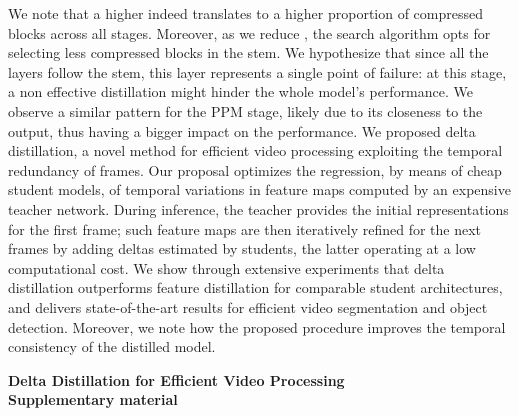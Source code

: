 \documentclass[runningheads]{llncs}
\newcommand{\opensupplement}{
    \setcounter{section}{0}
    \renewcommand\thesection{\Alph{section}}
}
\begin{document}
We note that a higher  indeed translates to a higher proportion of compressed blocks across all stages. Moreover, as we reduce , the search algorithm opts for selecting less compressed blocks in the stem. We hypothesize that since all the layers follow the stem, this layer represents a single point of failure: at this stage, a non effective distillation might hinder the whole model's performance. We observe a similar pattern for the PPM stage, likely due to its closeness to the output, thus having a bigger impact on the performance.
\label{sec:conclusion}
We proposed delta distillation, a novel method for efficient video processing exploiting the temporal redundancy of frames.
Our proposal optimizes the regression, by means of cheap student models, of temporal variations in feature maps computed by an expensive teacher network.
During inference, the teacher provides the initial representations for the first frame; 
such feature maps are then iteratively refined for the next frames by adding deltas estimated by students, the latter operating at a low computational cost.
We show through extensive experiments that delta distillation outperforms feature distillation for comparable student architectures, and delivers state-of-the-art results for efficient video segmentation and object detection.
Moreover, we note how the proposed procedure improves the temporal consistency of the distilled model.
% 

\clearpage
\opensupplement
\begin{center}
    \large \textbf{Delta Distillation for Efficient Video Processing\\Supplementary material}
\end{center}
\end{document}
